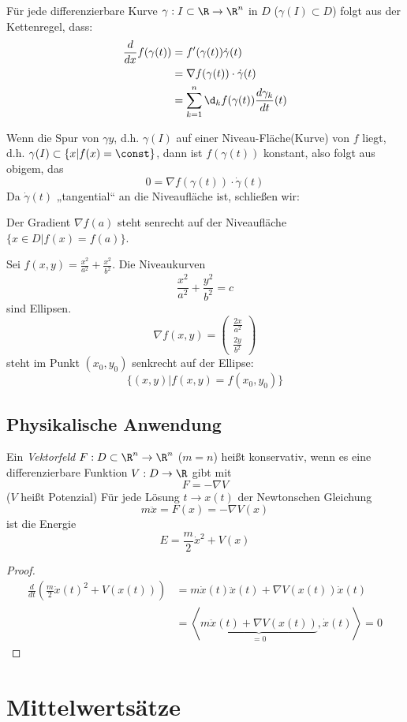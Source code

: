 \documentclass[a4paper,10pt]{scrbook}
\begin{document}
Für jede differenzierbare Kurve $\gamma:I\subset \R\to \R^n$ in $D$ ($\gamma(I)\subset D$) folgt aus der Kettenregel, dass:
\begin{align*}
\frac d{dx}f(\gamma(t))&=f'(\gamma(t))\dot\gamma(t)\\
&=\nabla f(\gamma(t))\cdot \dot\gamma(t)\\
&=\sum_{k=1}^n\d_kf(\gamma(t))\frac{d\gamma_k}{dt}(t)
\end{align*}

Wenn die Spur von $\gamma y$, d.h. $\gamma(I)$ auf einer Niveau-Fläche(Kurve) von $f$ liegt, d.h.
$\gamma(I)\subset\{x|f(x)=\const\}$, dann ist $f(\gamma(t))$ konstant, also folgt aus obigem, das
\[
0=\nabla f(\gamma(t))\cdot \dot\gamma(t)
\]
Da $\dot\gamma(t)$ „tangential“ an die Niveaufläche ist, schließen wir:

Der Gradient $\nabla f(a)$ steht senrecht auf der Niveaufläche $\{x\in D|f(x)=f(a)\}$.

\begin{ex*}
Sei $f(x,y)=\frac{x^2}{a^2}+\frac{x^2}{b^2}$.
Die Niveaukurven 
\[
\frac{x^2}{a^2}+\frac{y^2}{b^2}=c
\]
sind Ellipsen.
\[
	\nabla f(x,y)=\begin{pmatrix}\frac{2x}{a^2} \\[0.3em] \frac{2y}{b^2}\end{pmatrix}
\]
steht im Punkt $(x_0,y_0)$ senkrecht auf der Ellipse:
\[
\{(x,y)|f(x,y)=f(x_0,y_0)\}
\]
\end{ex*}

\subsection*{Physikalische Anwendung}

Ein \emph{Vektorfeld} $F:D\subset \R^n\to \R^n$ ($m=n$) heißt konservativ, wenn es eine differenzierbare Funktion
$V:D\to \R$ gibt mit
\[
F=-\nabla V
\]
($V$ heißt Potenzial)
Für jede Lösung $t\to x(t)$ der Newtonschen Gleichung
\[
m\ddot x=F(x)=-\nabla V(x)
\]
ist die Energie
\[
E=\frac m2 \dot x^2+V(x)
\]
\begin{proof}
\begin{align*}
\frac{d}{dt}\left(\frac m2 \dot x(t)^2+V(x(t))\right) &= m\dot x(t)\ddot x(t) + \nabla V(x(t))\dot x(t)\\
&=\left<\underbrace{m\ddot x(t)+\nabla V(x(t))}_{=0}, \dot x(t)\right> = 0
\end{align*}
\end{proof}

\section{Mittelwertsätze}
\end{document}
